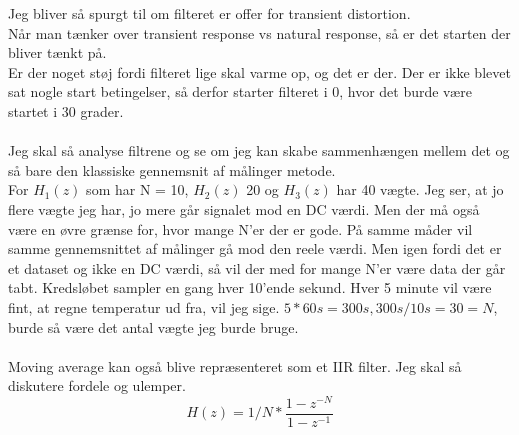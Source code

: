 \begin{Øvelser}
\begin{kapitel}
\begin{Øvelse}
            Jeg bliver så spurgt til om filteret er offer for transient distortion. \\
            Når man tænker over transient response vs natural response, så er det starten der bliver tænkt på. \\
            Er der noget støj fordi filteret lige skal varme op, og det er der. Der er ikke blevet sat nogle start betingelser, så derfor starter filteret i 0, hvor det burde være startet i 30 grader.\\\\

            Jeg skal så analyse filtrene og se om jeg kan skabe sammenhængen mellem det og så bare den klassiske gennemsnit af målinger metode.
            \\
            For $H_1(z)$ som har N = 10, $H_2(z)$ 20 og $H_3(z)$ har 40 vægte.
            Jeg ser, at jo flere vægte jeg har, jo mere går signalet mod en DC værdi. 
            Men der må også være en øvre grænse for, hvor mange N'er der er gode. 
            På samme måder vil samme gennemsnittet af målinger gå mod den reele værdi. 
            Men igen fordi det er et dataset og ikke en DC værdi, så vil der med for mange N'er være data der går tabt.
            Kredsløbet sampler en gang hver 10'ende sekund. Hver 5 minute vil være fint, at regne temperatur ud fra, vil jeg sige. 
            $5 * 60s = 300s, 300s/10s = 30 = N$, burde så være det antal vægte jeg burde bruge.\\\\

            Moving average kan også blive repræsenteret som et IIR filter. Jeg skal så diskutere fordele og ulemper.
            \[H(z) = 1/N * \frac{1 - z^{-N}}{1 - z^{-1}}\]


\end{Øvelse}
\end{kapitel}
\end{Øvelser}
